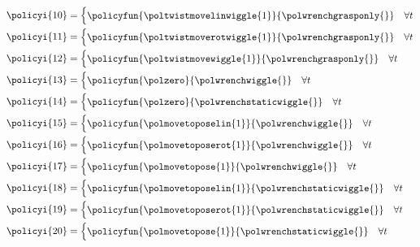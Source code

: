 \begin{align*}
&\policyi{10}=\begin{cases}
\policyfun{\poltwistmovelinwiggle{1}}{\polwrenchgrasponly{}} & \forall t
\end{cases}\\
&\policyi{11}=\begin{cases}
\policyfun{\poltwistmoverotwiggle{1}}{\polwrenchgrasponly{}} & \forall t
\end{cases}\\
&\policyi{12}=\begin{cases}
\policyfun{\poltwistmovewiggle{1}}{\polwrenchgrasponly{}} & \forall t
\end{cases}\\
&\policyi{13}=\begin{cases}
\policyfun{\polzero}{\polwrenchwiggle{}} & \forall t
\end{cases}\\
&\policyi{14}=\begin{cases}
\policyfun{\polzero}{\polwrenchstaticwiggle{}} & \forall t
\end{cases}\\
&\policyi{15}=\begin{cases}
\policyfun{\polmovetoposelin{1}}{\polwrenchwiggle{}} & \forall t
\end{cases}\\
&\policyi{16}=\begin{cases}
\policyfun{\polmovetoposerot{1}}{\polwrenchwiggle{}} & \forall t
\end{cases}\\
&\policyi{17}=\begin{cases}
\policyfun{\polmovetopose{1}}{\polwrenchwiggle{}} & \forall t
\end{cases}\\
&\policyi{18}=\begin{cases}
\policyfun{\polmovetoposelin{1}}{\polwrenchstaticwiggle{}} & \forall t
\end{cases}\\
&\policyi{19}=\begin{cases}
\policyfun{\polmovetoposerot{1}}{\polwrenchstaticwiggle{}} & \forall t
\end{cases}\\
&\policyi{20}=\begin{cases}
\policyfun{\polmovetopose{1}}{\polwrenchstaticwiggle{}} & \forall t
\end{cases}
\end{align*}


